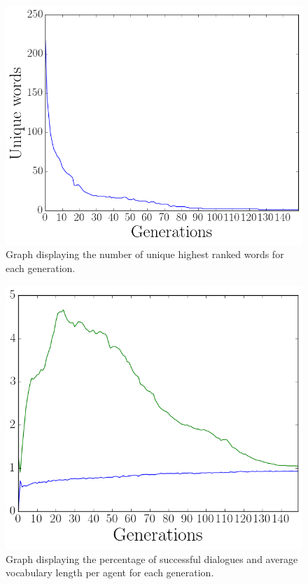 \begin{figure}[htbp]
    \centering
    \includegraphics[scale=0.5]{fig/Results/Exp5/UniqueWords1}
    \caption{Graph displaying the number of unique highest ranked words for each generation.}
    \label{fig:UniqueWords5}
\end{figure}
\begin{figure}[htbp]
    \centering
    \includegraphics[scale=0.5]{fig/Results/Exp5/Vocabulary1}
    \caption{Graph displaying the percentage of successful dialogues and average vocabulary length per agent for each generation.}
    \label{fig:Vocabulary5}
\end{figure}
